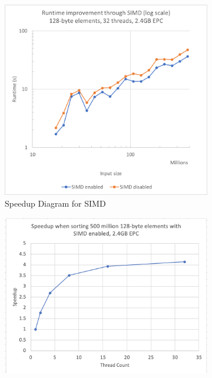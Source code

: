 \documentclass{article}
\begin{document}
\begin{figure}[h]
\begin{subfigure}[b]{0.3\linewidth}
    \end{subfigure}
    \hfill
    \begin{subfigure}[b]{0.3\linewidth}
        \includegraphics[width=\linewidth]{assets/simd_shuffle.png}
        \caption{Speedup Diagram for SIMD}
    \end{subfigure}
    \caption{Speedup Diagrams for Separtate Optimizations}
    \vspace{1cm}
    \begin{subfigure}[b]{0.45\linewidth}
        \includegraphics[width=\linewidth]{assets/speedup_sort.png}

\end{subfigure}
\end{figure}
\end{document}
